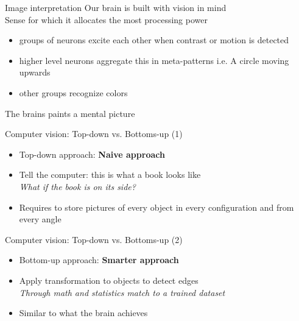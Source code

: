 \documentclass{beamer}
\begin{document}
\begin{frame}{Image interpretation}
Our brain is built with vision in mind \\
Sense for which it allocates the most processing power \\
\begin{itemize}
\item groups of neurons excite each other when contrast or motion is detected
\item higher level neurons aggregate this in meta-patterns i.e. A circle moving upwards
\item other groups recognize colors
\end{itemize}
The brains paints a mental picture
\end{frame}

\begin{frame}{Computer vision: Top-down vs. Bottoms-up (1)}
    \begin{itemize}
        \item Top-down approach: \textbf{Naive approach} \\
        \item Tell the computer: this is what a book looks like \\
            \hspace{0.27cm} \textit{What if the book is on its side?} \\
        \item Requires to store pictures of every object in every configuration and from every angle
    \end{itemize}
\end{frame}

\begin{frame}{Computer vision: Top-down vs. Bottoms-up (2)}
    \begin{itemize}
        \item Bottom-up approach: \textbf{Smarter approach} \\
        \item Apply transformation to objects to detect edges \\
            \hspace{0.27cm}\textit{Through math and statistics match to a trained dataset} \\
        \item Similar to what the brain achieves

\end{itemize}
    \end{frame}
\end{document}

